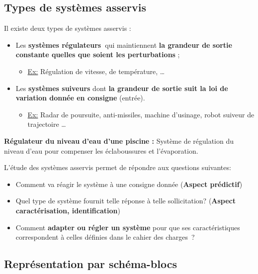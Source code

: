 \subsection{Types de systèmes
asservis}\label{types-de-systuxe8mes-asservis}

Il existe deux types de systèmes asservis :

\begin{itemize}
\item
  Les \textbf{systèmes régulateurs~}qui maintiennent \textbf{la grandeur
  de sortie constante quelles que soient les perturbations} ;

  \begin{itemize}
  \item
    \ul{Ex:} Régulation de vitesse, de température, \ldots{}
  \end{itemize}
\item
  Les \textbf{systèmes suiveurs} dont \textbf{la grandeur de sortie suit
  la loi de variation donnée en consigne} (entrée).

  \begin{itemize}
  \item
    \ul{Ex:} Radar de poursuite, anti-missiles, machine d'usinage, robot
    suiveur de trajectoire \ldots{}
  \end{itemize}
\end{itemize}

\textbf{Régulateur
du niveau d'eau d'une piscine :} Système de régulation du niveau d'eau
pour compenser les éclaboussures et l'évaporation.

L'étude des systèmes asservis permet de répondre aux questions
suivantes:

\begin{itemize}
\item
  Comment va réagir le système à une consigne donnée (\textbf{Aspect
  prédictif})
\item
  Quel type de système fournit telle réponse à telle sollicitation?
  (\textbf{Aspect caractérisation, identification})
\item
  Comment \textbf{adapter ou régler un système} pour que ses
  caractéristiques correspondent à celles définies dans le cahier des
  charges~?
\end{itemize}

\subsection{Représentation par
schéma-blocs}\label{repruxe9sentation-par-schuxe9ma-blocs}

